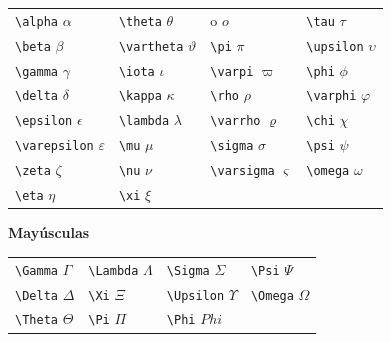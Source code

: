 \documentclass[
  a4paper,
]{scrreport}
\begin{document}
\begin{longtable}[]{@{}
  >{\raggedright\arraybackslash}p{}
  >{\raggedright\arraybackslash}p{}
  >{\raggedright\arraybackslash}p{}
  >{\raggedright\arraybackslash}p{}@{}}
\toprule()
\endhead
\texttt{\textbackslash{}alpha} \(\alpha\) &
\texttt{\textbackslash{}theta} \(\theta\) & o \(o\) &
\texttt{\textbackslash{}tau} \(\tau\) \\
\texttt{\textbackslash{}beta} \(\beta\) &
\texttt{\textbackslash{}vartheta} \(\vartheta\) &
\texttt{\textbackslash{}pi} \(\pi\) & \texttt{\textbackslash{}upsilon}
\(\upsilon\) \\
\texttt{\textbackslash{}gamma} \(\gamma\) &
\texttt{\textbackslash{}iota} \(\iota\) & \texttt{\textbackslash{}varpi}
\(\varpi\) & \texttt{\textbackslash{}phi} \(\phi\) \\
\texttt{\textbackslash{}delta} \(\delta\) &
\texttt{\textbackslash{}kappa} \(\kappa\) & \texttt{\textbackslash{}rho}
\(\rho\) & \texttt{\textbackslash{}varphi} \(\varphi\) \\
\texttt{\textbackslash{}epsilon} \(\epsilon\) &
\texttt{\textbackslash{}lambda} \(\lambda\) &
\texttt{\textbackslash{}varrho} \(\varrho\) &
\texttt{\textbackslash{}chi} \(\chi\) \\
\texttt{\textbackslash{}varepsilon} \(\varepsilon\) &
\texttt{\textbackslash{}mu} \(\mu\) & \texttt{\textbackslash{}sigma}
\(\sigma\) & \texttt{\textbackslash{}psi} \(\psi\) \\
\texttt{\textbackslash{}zeta} \(\zeta\) & \texttt{\textbackslash{}nu}
\(\nu\) & \texttt{\textbackslash{}varsigma} \(\varsigma\) &
\texttt{\textbackslash{}omega} \(\omega\) \\
\texttt{\textbackslash{}eta} \(\eta\) & \texttt{\textbackslash{}xi}
\(\xi\) & & \\
\bottomrule()
\end{longtable}

\textbf{Mayúsculas}

\begin{longtable}[]{@{}
  >{\raggedright\arraybackslash}p{}
  >{\raggedright\arraybackslash}p{}
  >{\raggedright\arraybackslash}p{}
  >{\raggedright\arraybackslash}p{}@{}}
\toprule()
\endhead
\texttt{\textbackslash{}Gamma} \(\Gamma\) &
\texttt{\textbackslash{}Lambda} \(\Lambda\) &
\texttt{\textbackslash{}Sigma} \(\Sigma\) & \texttt{\textbackslash{}Psi}
\(\Psi\) \\
\texttt{\textbackslash{}Delta} \(\Delta\) & \texttt{\textbackslash{}Xi}
\(\Xi\) & \texttt{\textbackslash{}Upsilon} \(\Upsilon\) &
\texttt{\textbackslash{}Omega} \(\Omega\) \\
\texttt{\textbackslash{}Theta} \(\Theta\) & \texttt{\textbackslash{}Pi}
\(\Pi\) & \texttt{\textbackslash{}Phi} \(Phi\) & \\
\bottomrule()
\end{longtable}
\end{document}
